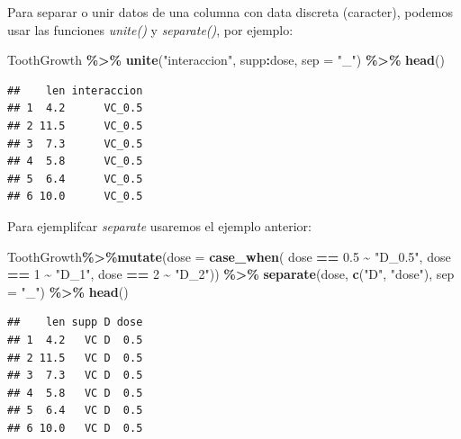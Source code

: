 \documentclass[
]{book}
\newenvironment{Shaded}{\begin{snugshade}}{\end{snugshade}}
\newcommand{\AttributeTok}[1]{\textcolor[rgb]{0.13,0.29,0.53}{#1}}
\newcommand{\DecValTok}[1]{\textcolor[rgb]{0.00,0.00,0.81}{#1}}
\newcommand{\FloatTok}[1]{\textcolor[rgb]{0.00,0.00,0.81}{#1}}
\newcommand{\FunctionTok}[1]{\textcolor[rgb]{0.13,0.29,0.53}{\textbf{#1}}}
\newcommand{\NormalTok}[1]{#1}
\newcommand{\SpecialCharTok}[1]{\textcolor[rgb]{0.81,0.36,0.00}{\textbf{#1}}}
\newcommand{\StringTok}[1]{\textcolor[rgb]{0.31,0.60,0.02}{#1}}
\begin{document}
\hfill\break
Para separar o unir datos de una columna con data discreta (caracter), podemos usar las funciones \emph{unite()} y \emph{separate()}, por ejemplo:

\begin{Shaded}
\begin{Highlighting}[]
\NormalTok{ToothGrowth }\SpecialCharTok{\%\textgreater{}\%} \FunctionTok{unite}\NormalTok{(}\StringTok{"interaccion"}\NormalTok{, supp}\SpecialCharTok{:}\NormalTok{dose, }\AttributeTok{sep =} \StringTok{"\_"}\NormalTok{) }\SpecialCharTok{\%\textgreater{}\%} \FunctionTok{head}\NormalTok{()}
\end{Highlighting}
\end{Shaded}

\begin{verbatim}
##    len interaccion
## 1  4.2      VC_0.5
## 2 11.5      VC_0.5
## 3  7.3      VC_0.5
## 4  5.8      VC_0.5
## 5  6.4      VC_0.5
## 6 10.0      VC_0.5
\end{verbatim}

\hfill\break
Para ejemplifcar \emph{separate} usaremos el ejemplo anterior:

\begin{Shaded}
\begin{Highlighting}[]
\NormalTok{ToothGrowth}\SpecialCharTok{\%\textgreater{}\%}\FunctionTok{mutate}\NormalTok{(}\AttributeTok{dose =} \FunctionTok{case\_when}\NormalTok{(}
\NormalTok{    dose }\SpecialCharTok{==} \FloatTok{0.5} \SpecialCharTok{\textasciitilde{}} \StringTok{"D\_0.5"}\NormalTok{,}
\NormalTok{    dose }\SpecialCharTok{==} \DecValTok{1} \SpecialCharTok{\textasciitilde{}} \StringTok{"D\_1"}\NormalTok{,}
\NormalTok{    dose }\SpecialCharTok{==} \DecValTok{2} \SpecialCharTok{\textasciitilde{}} \StringTok{"D\_2"}\NormalTok{)) }\SpecialCharTok{\%\textgreater{}\%} \FunctionTok{separate}\NormalTok{(dose, }\FunctionTok{c}\NormalTok{(}\StringTok{"D"}\NormalTok{, }\StringTok{"dose"}\NormalTok{),}
                                     \AttributeTok{sep =} \StringTok{"\_"}\NormalTok{) }\SpecialCharTok{\%\textgreater{}\%} \FunctionTok{head}\NormalTok{()}
\end{Highlighting}
\end{Shaded}

\begin{verbatim}
##    len supp D dose
## 1  4.2   VC D  0.5
## 2 11.5   VC D  0.5
## 3  7.3   VC D  0.5
## 4  5.8   VC D  0.5
## 5  6.4   VC D  0.5
## 6 10.0   VC D  0.5
\end{verbatim}
\end{document}
